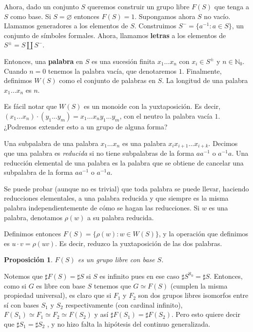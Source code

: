 \documentclass[12pt]{book}
\newtheorem{prop}[teo]{Proposición}
\theoremstyle{definition}
\newcommand{\NN}{\mathbb{N}}
\let\emptyset\varnothing
\begin{document}
Ahora, dado un conjunto $S$ queremos construir un grupo libre $F(S)$ que tenga a $S$ como base. Si $S=\emptyset$ entonces $F(S)=1$. Supongamos ahora $S$ no vacío. Llamamos generadores a los elementos de $S$. Construimos $S^- =\{a^{-1}:a\in S\}$, un conjunto de símboles formales. Ahora, llamamos \textbf{letras} a los elementos de $S^\pm = S \coprod S^-$.

Entonces, una \textbf{palabra} en $S$ es una sucesión finita $x_1\ldots x_n$ con $x_i\in S^\pm$ y $n\in\NN_0$. Cuando $n=0$ tenemos la palabra vacía, que denotaremos $1$. Finalmente, definimos $W(S)$ como el conjunto de palabras en $S$. La longitud de una palabra $x_1\ldots x_n$ es $n$.

Es fácil notar que $W(S)$ es un monoide con la yuxtaposición. Es decir, $(x_1\ldots x_n)\cdot (y_1\ldots y_m) = x_1\ldots x_n y_1\ldots y_m$, con el neutro la palabra vacía $1$. ¿Podremos extender esto a un grupo de alguna forma?

Una subpalabra de una palabra $x_1\ldots x_n$ es una palabra $x_ix_{i+1}\ldots x_{i+k}$. Decimos que una palabra es \textit{reducida} si no tiene subpalabras de la forma $aa^{-1}$ o  $a^{-1}a$. Una reducción elemental de una palabra es la palabra que se obtiene de cancelar una subpalabra de la forma $aa^{-1}$ o $a^{-1}a$.

Se puede probar (aunque no es trivial) que toda palabra se puede llevar, haciendo reducciones elementales, a una palabra reducida y que siempre es la misma palabra independientemente de cómo se hagan las reducciones. Si $w$ es una palabra, denotamos $\rho (w)$ a su palabra reducida.

Definimos entonces $F(S) = \{\rho (w) : w\in W(S)\}$, y la operación que definimos es $u\cdot v = \rho (uv)$. Es decir, reduzco la yuxtaposición de las dos palabras.

\begin{prop}
$F(S)$ es un grupo libre con base $S$.
\end{prop}

Notemos que $\sharp F(S) = \sharp S$ si $S$ es infinito pues en ese caso $\sharp S^{\aleph_0} = \sharp S$. Entonces, como si $G$ es libre con base $S$ tenemos que $G\simeq F(S)$ (cumplen la misma propiedad universal), es claro que si $F_1$ y $F_2$ son dos grupos libres isomorfos entre sí con bases $S_1$ y $S_2$ respectivamente (con cardinal infinito), $F(S_1)\simeq F_1\simeq F_2\simeq F(S_2)$ y así $\sharp F(S_1) = \sharp F(S_2)$. Pero esto quiere decir que $\sharp S_1 = \sharp S_2$ , y no hizo falta la hipótesis del continuo generalizada.
\end{document}
